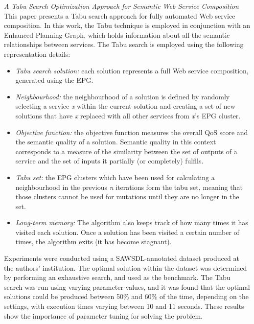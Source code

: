\textit{A Tabu Search Optimization Approach for Semantic Web Service Composition \cite{pop2011tabu}}\\
This paper presents a Tabu search approach for fully automated Web service composition. In this work, the Tabu technique is employed in conjunction with an Enhanced Planning Graph, which holds information about all the semantic relationships between services. The Tabu search is employed using the following representation details:
\begin{itemize}
 \item \textit{Tabu search solution:} each solution represents a full Web service composition, generated using the EPG.
 \item \textit{Neighbourhood:} the neighbourhood of a solution is defined by randomly selecting a service \textit{x} within the current solution and creating a set of new solutions that have \textit{x} replaced with all other services from \textit{x}'s EPG cluster.
 \item \textit{Objective function:} the objective function measures the overall QoS score and the semantic quality of a solution. Semantic quality in this context corresponds to a measure of the similarity between the set of outputs of a service and the set of inputs it partially (or completely) fulfils.
 \item \textit{Tabu set:} the EPG clusters which have been used for calculating a neighbourhood in the previous \textit{n} iterations form the tabu set, meaning that those clusters cannot be used for mutations until they are no longer in the set.
 \item \textit{Long-term memory:} The algorithm also keeps track of how many times it has visited each solution. Once a solution has been visited a certain number of times, the algorithm exits (it has become stagnant).
\end{itemize}

Experiments were conducted using a SAWSDL-annotated dataset produced at the authors' institution. The optimal solution within the dataset was determined by performing an exhaustive search, and used as the benchmark. The Tabu search was run using varying parameter values, and it was found that the optimal solutions could be produced between 50\% and 60\% of the time, depending on the settings, with execution times varying between 10 and 11 seconds. These results show the importance of parameter tuning for solving the problem.

